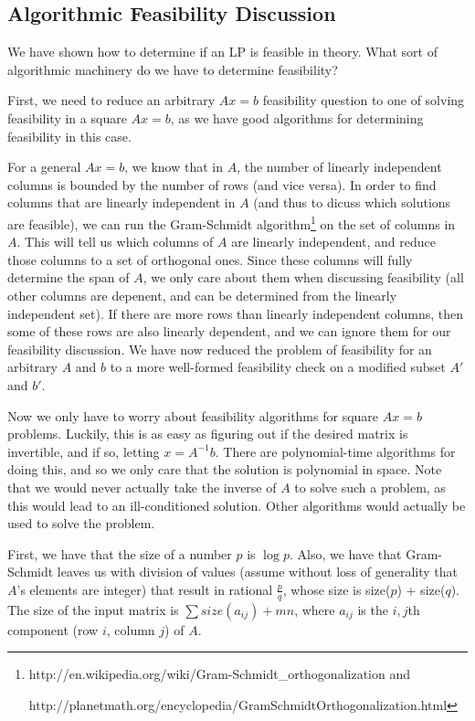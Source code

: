 \documentclass{article}
\begin{document}
\subsection{Algorithmic Feasibility Discussion}
We have shown how to determine if an LP is feasible in theory.  What sort of algorithmic machinery do we have to determine feasibility?

First, we need to reduce an arbitrary $Ax = b$ feasibility question to one of solving feasibility in a square $Ax=b$, as we have good algorithms for determining feasibility in this case.  

For a general $Ax=b$, we know that in $A$, the number of linearly independent columns is bounded by the number of rows (and vice versa).  In order to find columns that are linearly independent in $A$ (and thus to dicuss which solutions are feasible), we can run the Gram-Schmidt algorithm\footnote{http://en.wikipedia.org/wiki/Gram-Schmidt\_orthogonalization and  

\hspace{.09in}http://planetmath.org/encyclopedia/GramSchmidtOrthogonalization.html} on the set of columns in $A$.  This will tell us which columns of $A$ are linearly independent, and reduce those columns to a set of orthogonal ones.  Since these columns will fully determine the span of $A$, we only care about them when discussing feasibility (all other columns are depenent, and can be determined from the linearly independent set).  If there are more rows than linearly independent columns, then some of these rows are also linearly dependent, and we can ignore them for our feasibility discussion.  We have now reduced the problem of feasibility for an arbitrary $A$ and $b$ to a more well-formed feasibility check on a modified subset $A'$ and $b'$.

Now we only have to worry about feasibility algorithms for square $Ax=b$ problems.  Luckily, this is as easy as figuring out if the desired matrix is invertible, and if so, letting $x = A^{-1}b$.  There are polynomial-time algorithms for doing this, and so we only care that the solution is polynomial in space.  Note that we would never actually take the inverse of $A$ to solve such a problem, as this would lead to an ill-conditioned solution.  Other algorithms would actually be used to solve the problem.

First, we have that the size of a number $p$ is $\log p$.  Also, we have that Gram-Schmidt leaves us with division of values (assume without loss of generality that $A$'s elements are integer) that result in rational $\frac{p}{q}$, whose size is size($p$) + size($q$).  The size of the input matrix is $\sum size(a_{ij}) + mn$, where $a_{ij}$ is the $i,j$th component (row $i$, column $j$) of $A$.
\end{document}
